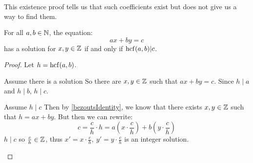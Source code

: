 \documentclass[../main.tex]{subfiles}
\begin{document}
\begin{remark}
  This existence proof tells us that such coefficients exist but does not give us a way to find them.
\end{remark}
\begin{corollary}
  For all $a, b \in \mathbb{N}$, the equation:
  \[
    ax + by = c
  \]
  has a solution for $x, y \in \mathbb{Z}$ if and only if $\operatorname{hcf}(a, b) | c$.
\end{corollary}
\begin{proof}
  Let $h = \operatorname{hcf}(a, b)$.
  \begin{proofdirection}{Assume there is a solution}
    So there are $x, y \in \mathbb{Z}$ such that $ax + by = c$.
    Since $h \mid a$ and $h \mid b$, $h \mid c$.
  \end{proofdirection}
  \begin{proofdirection}{Assume $h \mid c$}
    Then by \cref{bezoutsIdentity}, we know that there exists $x, y \in \mathbb{Z}$ such that $h = ax + by$.
    But then we can rewrite:
    \[
      c = \frac{c}{h} \cdot h = a \left(x \cdot \frac{c}{h}\right) + b \left(y \cdot \frac{c}{h}\right)
    \]
    $h \mid c$ so $\frac{c}{h} \in \mathbb{Z}$, thus $x' = x \cdot \frac{c}{h},\ y' = y \cdot \frac{c}{h}$ is an integer solution.
  \end{proofdirection}
\end{proof}
\end{document}
